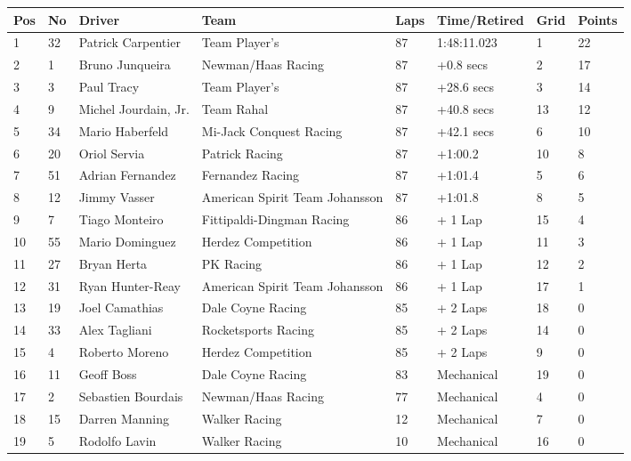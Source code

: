 \documentclass{article}
\begin{document}
\begin{tabular}{llllllll}
\toprule
Pos & No & Driver & Team & Laps & Time/Retired & Grid & Points \\
\midrule
1 & 32 & Patrick Carpentier & Team Player's & 87 & 1:48:11.023 & 1 & 22 \\
2 & 1 & Bruno Junqueira & Newman/Haas Racing & 87 & +0.8 secs & 2 & 17 \\
3 & 3 & Paul Tracy & Team Player's & 87 & +28.6 secs & 3 & 14 \\
4 & 9 & Michel Jourdain, Jr. & Team Rahal & 87 & +40.8 secs & 13 & 12 \\
5 & 34 & Mario Haberfeld & Mi-Jack Conquest Racing & 87 & +42.1 secs & 6 & 10 \\
6 & 20 & Oriol Servia & Patrick Racing & 87 & +1:00.2 & 10 & 8 \\
7 & 51 & Adrian Fernandez & Fernandez Racing & 87 & +1:01.4 & 5 & 6 \\
8 & 12 & Jimmy Vasser & American Spirit Team Johansson & 87 & +1:01.8 & 8 & 5 \\
9 & 7 & Tiago Monteiro & Fittipaldi-Dingman Racing & 86 & + 1 Lap & 15 & 4 \\
10 & 55 & Mario Dominguez & Herdez Competition & 86 & + 1 Lap & 11 & 3 \\
11 & 27 & Bryan Herta & PK Racing & 86 & + 1 Lap & 12 & 2 \\
12 & 31 & Ryan Hunter-Reay & American Spirit Team Johansson & 86 & + 1 Lap & 17 & 1 \\
13 & 19 & Joel Camathias & Dale Coyne Racing & 85 & + 2 Laps & 18 & 0 \\
14 & 33 & Alex Tagliani & Rocketsports Racing & 85 & + 2 Laps & 14 & 0 \\
15 & 4 & Roberto Moreno & Herdez Competition & 85 & + 2 Laps & 9 & 0 \\
16 & 11 & Geoff Boss & Dale Coyne Racing & 83 & Mechanical & 19 & 0 \\
17 & 2 & Sebastien Bourdais & Newman/Haas Racing & 77 & Mechanical & 4 & 0 \\
18 & 15 & Darren Manning & Walker Racing & 12 & Mechanical & 7 & 0 \\
19 & 5 & Rodolfo Lavin & Walker Racing & 10 & Mechanical & 16 & 0 \\
\bottomrule
\end{tabular}
\end{document}
